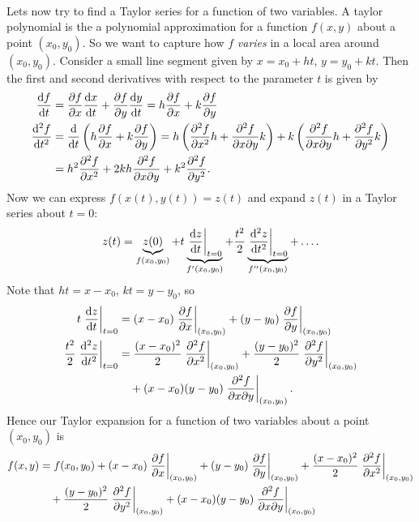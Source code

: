 \documentclass[../multivariate_calculus.tex]{subfiles}
\begin{document}
        \paragraph{}
        Lets now try to find a Taylor series for a function of two variables.
        A taylor polynomial is the a polynomial approximation for a function $f(x,y)$ about a point $(x_0,y_0)$.
        So we want to capture how $f$ \textit{varies} in a local area around $(x_0,y_0)$.
        Consider a small line segment given by $x=x_0+ht$, $y=y_0+kt$.
        Then the first and second derivatives with respect to the parameter $t$ is given by
        \begin{align}
            \frac{\mathrm{d}f}{\mathrm{d}t}&=\frac{\partial f}{\partial x}\frac{\mathrm{d}x}{\mathrm{d}t}+\frac{\partial f}{\partial y}\frac{\mathrm{d}y}{\mathrm{d}t}=h\frac{\partial f}{\partial x}+k\frac{\partial f}{\partial y}\\
            \frac{\mathrm{d}^2{f}}{\mathrm{d}{t}^2}&=\frac{\mathrm{d}}{\mathrm{d}t}\left(h\frac{\partial f}{\partial x}+k\frac{\partial f}{\partial y}\right)=h\left(\frac{\partial^2{f}}{\partial{x}^2}h+\frac{\partial^2 f}{\partial x\partial y}k\right)+k\left(\frac{\partial^2 f}{\partial x\partial y}h+\frac{\partial^2{f}}{\partial{y}^2}k\right)\\
            &=h^2\frac{\partial^2{f}}{\partial{x}^2}+2kh\frac{\partial^2 f}{\partial x\partial y}+k^2\frac{\partial^2{f}}{\partial{y}^2}.
        \end{align}
        Now we can express $f(x(t),y(t))=z(t)$ and expand $z(t)$ in a Taylor series about $t=0$:
        \begin{equation}
            z(t)=\underbrace{z(0)}_{f(x_0,y_0)}+t\underbrace{\left.\frac{\mathrm{d}z}{\mathrm{d}t}\right|_{t=0}}_{f^\prime(x_0,y_0)}+\frac{t^2}{2}\underbrace{\left.\frac{\mathrm{d}^2{z}}{\mathrm{d}{t}^2}\right|_{t=0}}_{f^{\prime\prime}(x_0,y_0)}+\dots.
        \end{equation}
        Note that $ht=x-x_0$, $kt=y-y_0$, so
        \begin{align}
            t\left.\frac{\mathrm{d}z}{\mathrm{d}t}\right|_{t=0}&=(x-x_0)\left.\frac{\partial f}{\partial x}\right|_{(x_0,y_0)}+(y-y_0)\left.\frac{\partial f}{\partial y}\right|_{(x_0,y_0)}\\
            \frac{t^2}{2}\left.\frac{\mathrm{d}^2{z}}{\mathrm{d}{t}^2}\right|_{t=0}&=\frac{(x-x_0)^2}{2}\left.\frac{\partial^2{f}}{\partial{x}^2}\right|_{(x_0,y_0)}+\frac{(y-y_0)^2}{2}\left.\frac{\partial^2{f}}{\partial{y}^2}\right|_{(x_0,y_0)}\\
            &\quad+(x-x_0)(y-y_0)\left.\frac{\partial^2 f}{\partial x\partial y}\right|_{(x_0,y_0)}.
        \end{align}
        Hence our Taylor expansion for a function of two variables about a point $(x_0,y_0)$ is
        \begin{align}\label{eq-taylor-series-2D}
            f(x,y)&=f(x_0,y_0)+(x-x_0)\left.\frac{\partial f}{\partial x}\right|_{(x_0,y_0)}+(y-y_0)\left.\frac{\partial f}{\partial y}\right|_{(x_0,y_0)}+\frac{(x-x_0)^2}{2}\left.\frac{\partial^2{f}}{\partial{x}^2}\right|_{(x_0,y_0)}\\
            &\quad+\frac{(y-y_0)^2}{2}\left.\frac{\partial^2{f}}{\partial{y}^2}\right|_{(x_0,y_0)}+(x-x_0)(y-y_0)\left.\frac{\partial^2 f}{\partial x\partial y}\right|_{(x_0,y_0)}
        \end{align}
\end{document}
